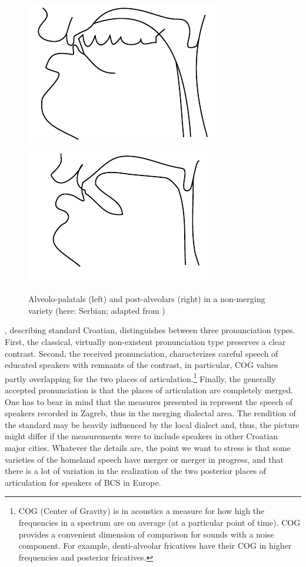 \documentclass[output=paper,modfonts,newtxmath,hidelinks,]{langscibook}
\begin{document}
\begin{figure}
\includegraphics[width=.45\textwidth]{figures/MCFigure2left.pdf}
\includegraphics[width=.45\textwidth]{figures/MCFigure2right.pdf}
\caption{\label{fig:mihajlovic:2} Alveolo-palatals (left) and post-alveolars (right) in a non-merging variety (here: Serbian; adapted from \citealt{Miletic1958})}
\end{figure}


\citet{Skaric2009}, %
describing standard Croatian, distinguishes between three pronunciation types. First, the classical, virtually non-existent pronunciation type preserves a clear contrast. Second, the received pronunciation, characterizes careful speech of educated speakers with remnants of the contrast, in particular, COG values partly overlapping for the two places of articulation.\footnote{COG (Center of Gravity) is in acoustics a measure for how high the frequencies in a spectrum are on average (at a particular point of time). COG provides a convenient dimension of comparison for sounds with a noise component. For example, denti-alveolar fricatives have their COG in higher frequencies and posterior fricatives.} Finally, the generally accepted pronunciation is that the places of articulation are completely merged. One has to bear in mind that the measures presented in \citet{Skaric2009} represent the speech of speakers recorded in Zagreb, thus in the merging dialectal area. The rendition of the standard may be heavily influenced by the local dialect and, thus, the picture might differ if the measurements were to include speakers in other Croatian major cities. Whatever the details are, the point we want to stress is that some varieties of the homeland speech have merger or merger in progress, and that there is a lot of variation in the realization of the two posterior places of articulation for speakers of BCS in Europe.
\end{document}
